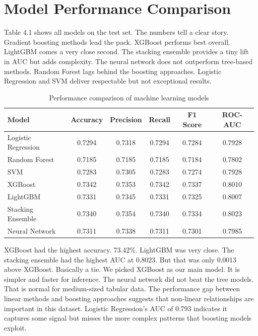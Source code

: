 \documentclass[12pt, a4paper, oneside]{book}
\begin{document}
\section{Model Performance Comparison}
Table 4.1 shows all models on the test set. The numbers tell a clear story. Gradient boosting methods lead the pack. XGBoost performs best overall. LightGBM comes a very close second. The stacking ensemble provides a tiny lift in AUC but adds complexity. The neural network does not outperform tree-based methods. Random Forest lags behind the boosting approaches. Logistic Regression and SVM deliver respectable but not exceptional results.

\begin{table}[H]
\centering
{}
\renewcommand{\arraystretch}{1.1}
\caption{Performance comparison of machine learning models}
\label{tab:model_performance}
\small
\begin{tabular}{l S[table-format=1.4] S[table-format=1.4] S[table-format=1.4] S[table-format=1.4] S[table-format=1.4]}
\toprule
Model                  & {Accuracy} & {Precision} & {Recall} & {F1 Score} & {ROC-AUC} \\
\midrule
Logistic Regression    & 0.7294 & 0.7318 & 0.7294 & 0.7284 & 0.7928 \\
Random Forest          & 0.7185 & 0.7185 & 0.7185 & 0.7184 & 0.7802 \\
SVM                    & 0.7283 & 0.7305 & 0.7283 & 0.7274 & 0.7928 \\
XGBoost                & 0.7342 & 0.7353 & 0.7342 & 0.7337 & 0.8010 \\
LightGBM               & 0.7331 & 0.7345 & 0.7331 & 0.7325 & 0.8007 \\
Stacking Ensemble      & 0.7340 & 0.7354 & 0.7340 & 0.7334 & 0.8023 \\
Neural Network         & 0.7311 & 0.7338 & 0.7311 & 0.7301 & 0.7985 \\
\bottomrule
\end{tabular}
\end{table}

XGBoost had the highest accuracy. 73.42\%. LightGBM was very close. The stacking ensemble had the highest AUC at 0.8023. But that was only 0.0013 above XGBoost. Basically a tie. We picked XGBoost as our main model. It is simpler and faster for inference. The neural network did not beat the tree models. That is normal for medium-sized tabular data. The performance gap between linear methods and boosting approaches suggests that non-linear relationships are important in this dataset. Logistic Regression's AUC of 0.793 indicates it captures some signal but misses the more complex patterns that boosting models exploit.
\end{document}
